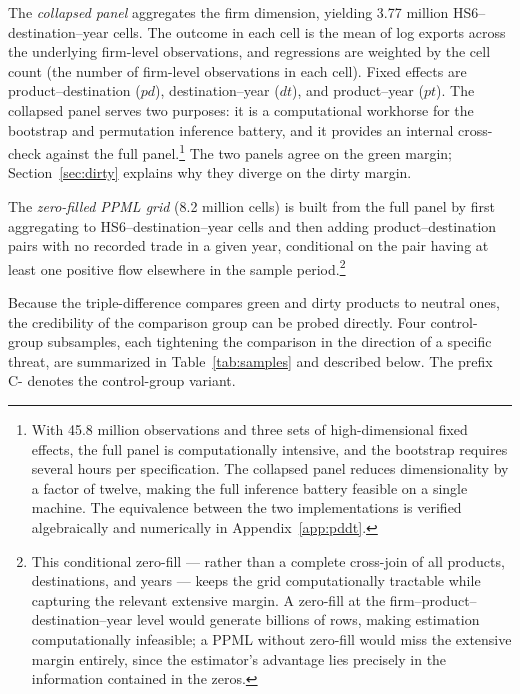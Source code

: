 \documentclass[12pt]{article}
\begin{document}
The \emph{collapsed panel} aggregates the firm dimension, yielding 3.77 million
HS6--destination--year cells. The outcome in each cell is the mean of log exports across
the underlying firm-level observations, and regressions are weighted by the cell count
(the number of firm-level observations in each cell). Fixed effects are
product--destination ($pd$), destination--year ($dt$), and product--year ($pt$). The
collapsed panel serves two purposes: it is a computational workhorse for the bootstrap
and permutation inference battery, and it provides an internal cross-check against the
full panel.\footnote{With 45.8 million observations and three sets of high-dimensional
fixed effects, the full panel is computationally intensive, and the bootstrap requires
several hours per specification. The collapsed panel reduces dimensionality by a
factor of twelve, making the full inference battery feasible on a single machine. The
equivalence between the two implementations is verified algebraically and numerically
in Appendix~\ref{app:pddt}.} The two panels agree on the green margin; Section~\ref{sec:dirty} explains why they diverge on the dirty margin.

The \emph{zero-filled PPML grid} (8.2 million cells) is built from the full panel by
first aggregating to HS6--destination--year cells and then adding product--destination
pairs with no recorded trade in a given year, conditional on the pair having at least one
positive flow elsewhere in the sample period.\footnote{This conditional zero-fill --- rather than a
complete cross-join of all products, destinations, and years --- keeps the grid
computationally tractable while capturing the relevant extensive margin. A zero-fill at the firm--product--destination--year level would generate
billions of rows, making estimation computationally infeasible; a PPML without zero-fill would miss the
extensive margin entirely, since the estimator's advantage lies precisely in the
information contained in the zeros.}

Because the triple-difference compares green and dirty products to neutral ones, the
credibility of the comparison group can be probed directly. Four control-group subsamples,
each tightening the comparison in the direction of a specific threat, are summarized in
Table~\ref{tab:samples} and described below. The prefix C- denotes the control-group variant.
\end{document}
